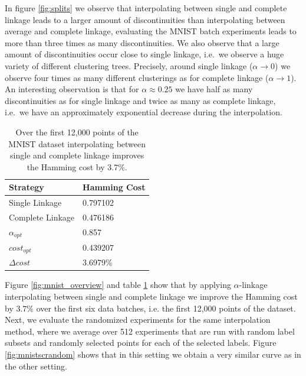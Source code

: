 In figure \ref{fig:splits} we observe that interpolating between single and complete linkage leads to a larger amount of discontinuities than interpolating between average and complete linkage, evaluating the MNIST batch experiments leads to more than three times as many discontinuities. We also observe that a large amount of discontinuities occur close to single linkage, i.e.\ we observe a huge variety of different clustering trees. Precisely, around single linkage ($\alpha \rightarrow 0$) we observe four times as many different clusterings as for complete linkage ($\alpha \rightarrow 1$). An interesting observation is that for $\alpha \approx 0.25$ we have half as many discontinuities as for single linkage and twice as many as complete linkage, i.e.\ we have an approximately exponential decrease during the interpolation.

\begin{table}[H]
    \centering
    \begin{tabular}{|l | l |}
    \hline
    Strategy & Hamming Cost\\ \hline
    Single Linkage & 0.797102\\
    Complete Linkage & 0.476186\\
    $\alpha_{opt}$ & 0.857\\
    $cost_{opt}$ & 0.439207\\
    $\Delta cost$ & 3.6979\%\\\hline
    \end{tabular}
    \caption{Over the first 12,000 points of the MNIST dataset interpolating between single and complete linkage improves the Hamming cost by $3.7\%$.}
    \label{table:mnist1000avgsc}
\end{table}

Figure \ref{fig:mnist_overview} and table \ref{table:mnist1000avgsc} show that by applying $\alpha$-linkage interpolating between single and complete linkage we improve the Hamming cost by $3.7\%$ over the first six data batches, i.e. the first 12,000 points of the dataset. Next, we evaluate the randomized experiments for the same interpolation method, where we average over 512 experiments that are run with random label subsets and randomly selected points for each of the selected labels. Figure \ref{fig:mnistscrandom} shows that in this setting we obtain a very similar curve as in the other setting.

